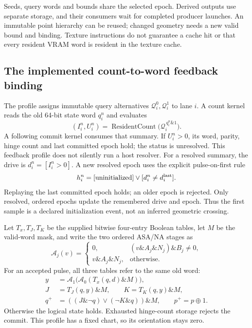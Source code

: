 Seeds, query words and bounds share the selected epoch. Derived outputs use
separate storage, and their consumers wait for completed producer launches.
An immutable point hierarchy can be reused; changed geometry needs a new
valid bound and binding. Texture instructions do not guarantee a cache hit
or that every resident VRAM word is resident in the texture cache.

\subsection{The implemented count-to-word feedback binding}
The  profile assigns immutable query alternatives
$\mathcal Q_i^0,\mathcal Q_i^1$ to lane $i$. A count kernel reads the old
64-bit state word $q_i^n$ and evaluates
\begin{equation}
 (I_i^n,U_i^n)=\operatorname{ResidentCount}
       \bigl(\mathcal Q_i^{\,q_i^n\mathbin{\&}1}\bigr).
 \label{eq:r15-resident-selection}
\end{equation}
A following commit kernel consumes that summary. If $U_i^n>0$, its word,
parity, hinge count and last committed epoch hold; the status is unresolved.
This feedback profile does not silently run a host resolver. For a resolved
summary, the drive is $d_i^n=[I_i^n>0]$. A new resolved epoch uses the explicit
pulse-on-first rule
\begin{equation}
 h_i^n=[\text{uninitialized}]
        \mathbin{\lor}[d_i^n\ne d_i^{\rm last}].
 \label{eq:r15-resident-pulse}
\end{equation}
Replaying the last committed epoch holds; an older epoch is rejected.
Only resolved, ordered epochs update the remembered drive and epoch.
Thus the first sample is a declared initialization event, not an inferred
geometric crossing.

Let $T_x,T_J,T_K$ be the supplied bitwise four-entry Boolean tables, let $M$
be the valid-word mask, and write the two ordered ASA/NA stages as
\begin{equation}
 \mathcal A_j(v)=
 \begin{cases}
 0,&(v\mathbin{\&}A_j\mathbin{\&}N_j)\mathbin{\&}B_j\ne0,\\
 v\mathbin{\&}A_j\mathbin{\&}N_j,&\text{otherwise}.
 \end{cases}
 \label{eq:r15-resident-mask}
\end{equation}
For an accepted pulse, all three tables refer to the same old word:
\begin{align}
 y&=\mathcal A_1\bigl(\mathcal A_0(T_x(q,d)\mathbin{\&}M)\bigr),\\
 J&=T_J(q,y)\mathbin{\&}M,\qquad K=T_K(q,y)\mathbin{\&}M,\\
 q^+&=((J\mathbin{\&}\neg q)\mathbin{\lor}
                      (\neg K\mathbin{\&}q))\mathbin{\&}M,
 \qquad p^+=p\mathbin{\oplus}1.
 \label{eq:r15-resident-jk}
\end{align}
Otherwise the logical state holds. Exhausted hinge-count storage rejects the
commit. This profile has a fixed chart, so its orientation stays zero.

